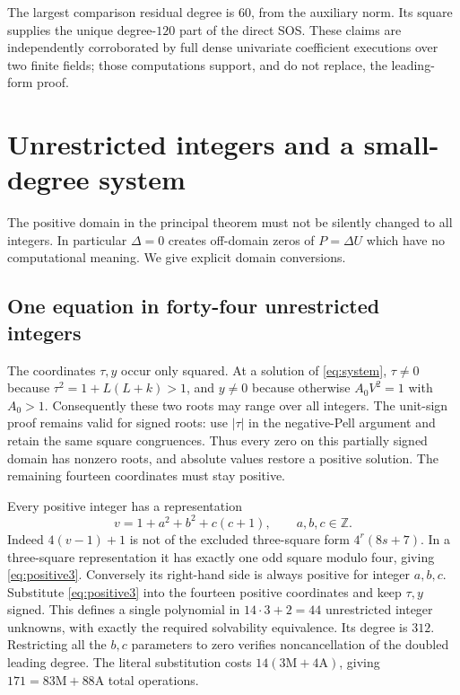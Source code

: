 \documentclass[11pt]{article}
\theoremstyle{remark}\newtheorem{remark}[theorem]{Remark}
\newcommand{\Z}{\mathbb Z}\newcommand{\N}{\mathbb N}\newcommand{\pos}{\mathbb Z_{>0}}
\begin{document}
The largest comparison residual degree is $60$, from the auxiliary
norm. Its square supplies the unique degree-$120$ part of the
direct SOS. These claims are independently corroborated by full
dense univariate coefficient executions over two finite fields;
those computations support, and do not replace, the leading-form
proof.

\section{Unrestricted integers and a small-degree system}\label{sec:integer}

The positive domain in the principal theorem must not be silently
changed to all integers. In particular $\Delta=0$ creates
off-domain zeros of $P=\Delta U$ which have no computational
meaning. We give explicit domain conversions.

\subsection{One equation in forty-four unrestricted integers}

The coordinates $\tau,y$ occur only squared. At a solution of
\eqref{eq:system}, $\tau\ne0$ because
$\tau^2=1+L(L+k)>1$, and $y\ne0$ because otherwise
$A_0V^2=1$ with $A_0>1$. Consequently these two roots may range
over all integers. The unit-sign proof remains valid for signed
roots: use $|\tau|$ in the negative-Pell argument and retain the
same square congruences. Thus every zero on this partially signed
domain has nonzero roots, and absolute values restore a positive solution.
The remaining fourteen coordinates must stay positive.

Every positive integer has a representation
\begin{equation}\label{eq:positive3}
 v=1+a^2+b^2+c(c+1),\qquad a,b,c\in\Z.
\end{equation}
Indeed $4(v-1)+1$ is not of the excluded three-square form
$4^r(8s+7)$. In a three-square representation it has exactly
one odd square modulo four, giving \eqref{eq:positive3}.
Conversely its right-hand side is always positive for integer
$a,b,c$. Substitute \eqref{eq:positive3} into the fourteen
positive coordinates and keep $\tau,y$ signed. This defines a
single polynomial in $14\cdot3+2=44$ unrestricted integer
unknowns, with exactly the required solvability equivalence.
Its degree is $312$. Restricting all the $b,c$ parameters to
zero verifies noncancellation of the doubled leading degree.
The literal substitution costs $14(3\mathrm M+4\mathrm A)$,
giving $171=83\mathrm M+88\mathrm A$ total operations.
\end{document}
